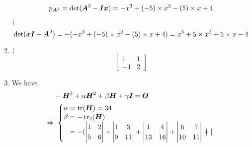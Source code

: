 \documentclass[a4paper,12pt]{article}
\begin{document}
\begin{enumerate}
\begin{equation}
        p_{\boldsymbol{A}^2} = \det(\boldsymbol{A}^2 - \boldsymbol{I}\boldsymbol{x}) = -x^3 + (-5) \times x^2 - (5) \times x + 4
    \end{equation}
    \begin{answer}{$\dag$}\begin{equation}
            \det(\boldsymbol{x}\boldsymbol{I} - \boldsymbol{A}^2) = -(-x^3 + (-5) \times x^2 - (5) \times x + 4) = x^3 + 5 \times x^2 + 5 \times x - 4
        \end{equation}
    \end{answer}
    \item \begin{answer}{$\dag$}\begin{equation}
            \begin{bmatrix}
                1 & 1 \\
                -1 & 2
            \end{bmatrix}
        \end{equation}
    \end{answer}
    \item We have \begin{equation}
        \begin{aligned}
            & -\boldsymbol{H}^3 + \alpha \boldsymbol{H}^2 + \beta \boldsymbol{H} + \gamma \boldsymbol{I} = \boldsymbol{O} \\
            \Rightarrow & \ \begin{cases}
                \alpha = \operatorname{tr}(\boldsymbol{H}) = 34 \\
                \begin{aligned} \beta & = -\operatorname{tr}_2(\boldsymbol{H}) \\ 
                & = -(\begin{vmatrix}
                    1 & 2 \\
                    5 & 6
                \end{vmatrix} + \begin{vmatrix}
                    1 & 3 \\
                    9 & 11
                \end{vmatrix} + \begin{vmatrix}
                    1 & 4 \\
                    13 & 16
                \end{vmatrix} + \begin{vmatrix}
                    6 & 7 \\
                    10 & 11
                \end{vmatrix} + \begin{vmatrix}

\end{vmatrix}
\end{aligned}
\end{cases}
\end{aligned}
\end{equation}
\end{enumerate}
\end{document}
